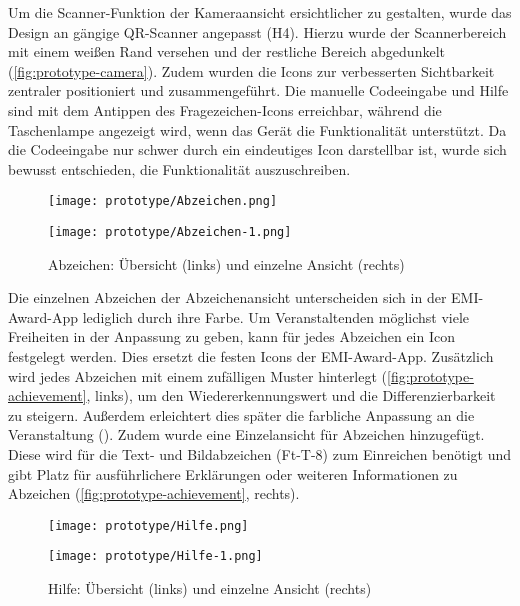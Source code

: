 Um die Scanner-Funktion der Kameraansicht ersichtlicher zu gestalten, wurde das
Design an gängige QR-Scanner angepasst (H4). Hierzu wurde der Scannerbereich mit
einem weißen Rand versehen und der restliche Bereich abgedunkelt (\autoref{fig:prototype-camera}). Zudem wurden die Icons zur verbesserten
Sichtbarkeit zentraler positioniert und zusammengeführt. Die manuelle
Codeeingabe und Hilfe sind mit dem Antippen des Fragezeichen-Icons erreichbar,
während die Taschenlampe angezeigt wird, wenn das Gerät die Funktionalität
unterstützt. Da die Codeeingabe nur schwer durch ein eindeutiges Icon
darstellbar ist, wurde sich bewusst entschieden, die Funktionalität auszuschreiben.

\begin{figure}[htpb]
    \begin{minipage}{.5\textwidth}
        \centering
        \texttt{[image: prototype/Abzeichen.png]}
    \end{minipage}%
    \begin{minipage}{.5\textwidth}
        \centering
        \texttt{[image: prototype/Abzeichen-1.png]}
    \end{minipage}
    \caption{Abzeichen: Übersicht (links) und einzelne Ansicht (rechts)}
    \label{fig:prototype-achievement}
\end{figure}

Die einzelnen Abzeichen der Abzeichenansicht unterscheiden sich in der
EMI-Award-App lediglich durch ihre Farbe. Um Veranstaltenden möglichst viele
Freiheiten in der Anpassung zu geben, kann für jedes Abzeichen ein Icon
festgelegt werden. Dies ersetzt die festen Icons der EMI-Award-App. Zusätzlich
wird jedes Abzeichen mit einem zufälligen Muster hinterlegt (\autoref{fig:prototype-achievement}, links), um den Wiedererkennungswert und die
Differenzierbarkeit zu steigern. Außerdem erleichtert dies später die farbliche
Anpassung an die Veranstaltung (). Zudem wurde eine Einzelansicht
für Abzeichen hinzugefügt. Diese wird für die Text- und Bildabzeichen (Ft-T-8)
zum Einreichen benötigt und gibt Platz für ausführlichere Erklärungen oder
weiteren Informationen zu Abzeichen (\autoref{fig:prototype-achievement},
rechts).

\begin{figure}[htpb]
    \begin{minipage}{.5\textwidth}
        \centering
        \texttt{[image: prototype/Hilfe.png]}
    \end{minipage}%
    \begin{minipage}{.5\textwidth}
        \centering
        \texttt{[image: prototype/Hilfe-1.png]}
    \end{minipage}
    \caption{Hilfe: Übersicht (links) und einzelne Ansicht (rechts)}
    \label{fig:prototype-help}
\end{figure}

